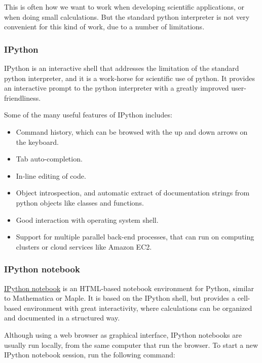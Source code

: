 \documentclass[11pt]{article}
\providecommand{\tightlist}{%
      \setlength{\itemsep}{0pt}\setlength{\parskip}{0pt}}
\begin{document}
This is often how we want to work when developing scientific
applications, or when doing small calculations. But the standard python
interpreter is not very convenient for this kind of work, due to a
number of limitations.

    \hypertarget{ipython}{%
\subsubsection{IPython}\label{ipython}}

    IPython is an interactive shell that addresses the limitation of the
standard python interpreter, and it is a work-horse for scientific use
of python. It provides an interactive prompt to the python interpreter
with a greatly improved user-friendliness.

Some of the many useful features of IPython includes:

\begin{itemize}
\tightlist
\item
  Command history, which can be browsed with the up and down arrows on
  the keyboard.
\item
  Tab auto-completion.
\item
  In-line editing of code.
\item
  Object introspection, and automatic extract of documentation strings
  from python objects like classes and functions.
\item
  Good interaction with operating system shell.
\item
  Support for multiple parallel back-end processes, that can run on
  computing clusters or cloud services like Amazon EC2.
\end{itemize}

    \hypertarget{ipython-notebook}{%
\subsubsection{IPython notebook}\label{ipython-notebook}}

    \href{http://ipython.org/notebook.html}{IPython notebook} is an
HTML-based notebook environment for Python, similar to Mathematica or
Maple. It is based on the IPython shell, but provides a cell-based
environment with great interactivity, where calculations can be
organized and documented in a structured way.

Although using a web browser as graphical interface, IPython notebooks
are usually run locally, from the same computer that run the browser. To
start a new IPython notebook session, run the following command:
\end{document}
